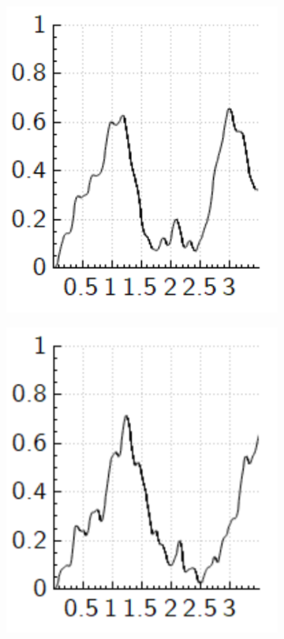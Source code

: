 \documentclass[aps,pra,reprint,superscriptaddress]{revtex4-1}
\begin{document}
\begin{figure}
	\begin{subfigure}{0.45\columnwidth}
		\includegraphics[width=\columnwidth]{graphics/exploration/betaNonOptFidelityBeta7.PNG}
	\end{subfigure}
	\begin{subfigure}{0.45\columnwidth}
		\includegraphics[width=\columnwidth]{graphics/exploration/betaNonOptFidelityBeta12.PNG}

\end{subfigure}
\end{figure}
\end{document}
